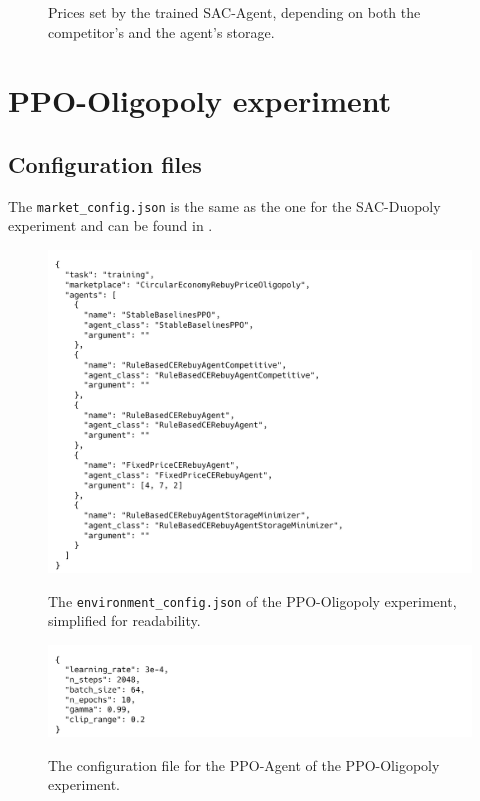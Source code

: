 \begin{figure}[ht]
\begin{subfigure}[t]{0.49\textwidth}
		\label{fig:AppendixSACDuopolyPolicyanalyser2rebuy}
	\end{subfigure}
	\caption{Prices set by the trained SAC-Agent, depending on both the competitor's and the agent's storage.}\label{fig:AppendixSACDuopolyPolicyanalyser2}
\end{figure}

\clearpage
\section{PPO-Oligopoly experiment}\label{sec:AppendixOligopoly}

\subsection{Configuration files}\label{subsec:AppendixOligopolyConfig}

The \texttt{market\_config.json} is the same as the one for the SAC-Duopoly experiment and can be found in .

\begin{figure}[ht]
	\includegraphics[width = \textwidth]{images/configs/PPOOligopoly/PPOOligopolyEnvironment.png}\\
	\caption{The \texttt{environment\_config.json} of the PPO-Oligopoly experiment, simplified for readability.}\label{fig:PPOOligopolyConfigEnvironment}
\end{figure}

\begin{figure}[ht]
	\includegraphics[width = \textwidth]{images/configs/PPOOligopoly/PPOOligopolyAgent.png}\\
	\caption{The configuration file for the PPO-Agent of the PPO-Oligopoly experiment.}\label{fig:PPOOligopolyConfigAgent}
\end{figure}

